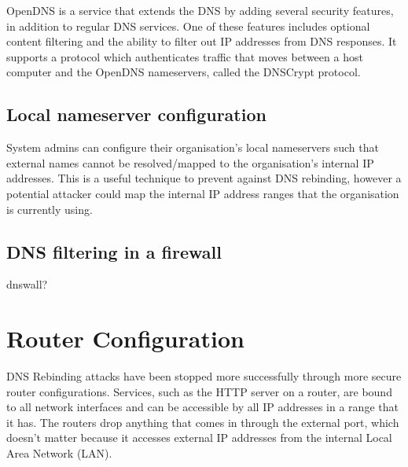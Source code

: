 OpenDNS is a service that extends the DNS by adding several security
features, in addition to regular DNS services. One of these features
includes optional content filtering and the ability to filter out
IP addresses from DNS responses. It supports a protocol which
authenticates traffic that moves between a host computer and the
OpenDNS nameservers, called the DNSCrypt protocol.

\subsection{Local nameserver configuration}

System admins can configure their organisation's local nameservers
such that external names cannot be resolved/mapped to the organisation's
internal IP addresses. This is a useful technique to prevent against
DNS rebinding, however a potential attacker could map the internal
IP address ranges that the organisation is currently using.

\subsection{DNS filtering in a firewall}

dnswall?

\section{Router Configuration}

DNS Rebinding attacks have been stopped more successfully through
more secure router configurations. Services, such as the HTTP server
on a router, are bound to all network interfaces and can be accessible
by all IP addresses in a range that it has. The routers drop anything
that comes in through the external port, which doesn't matter because
it accesses external IP addresses from the internal Local Area Network (LAN).
